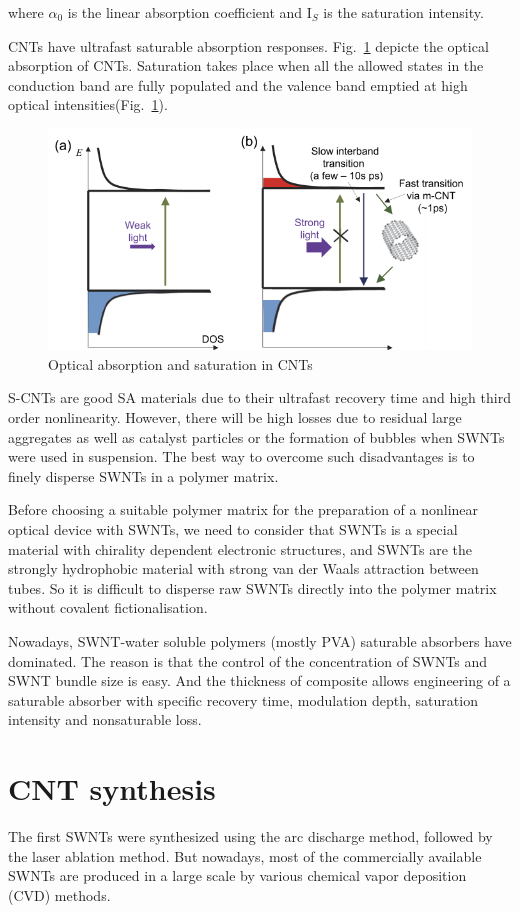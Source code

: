 \documentclass{phyasgn}\usepackage{nag}
\newcommand{\figref}[1]{Fig.~\ref{#1}}
\begin{document}
where $\alpha_0$ is the linear absorption coefficient and I$_S$ is the saturation intensity.
\par CNTs have ultrafast saturable absorption responses\cite{chen2002ultrafast,tatsuura2003semiconductor}. \figref{9} depicte the optical absorption of CNTs. Saturation takes place when all the allowed states in the conduction band are fully populated and the valence band emptied at high optical intensities(\figref{9}).
\begin{figure}[!h]
	\centering
	\includegraphics[width=.7\linewidth]{pic/9.png}
	\caption[Band structures]{Optical absorption and saturation in CNTs\cite{martinez2013nanotube}}
	\label{9}
	\end{figure}
\par S-CNTs are good SA materials due to their ultrafast recovery time and high third order nonlinearity. However, there will be high losses due to residual large aggregates as well as catalyst particles or the formation of bubbles when SWNTs were used in suspension\cite{yamashita2004saturable}. The best way to overcome such disadvantages is to finely disperse SWNTs in a polymer matrix\cite{yamashita2004saturable}.
\par Before choosing a suitable polymer matrix for the preparation of a nonlinear optical device with SWNTs, we need to consider that SWNTs is a special material with chirality dependent electronic structures, and SWNTs are the strongly hydrophobic material with strong van der Waals attraction between tubes. So it is difficult to disperse raw SWNTs directly into the polymer matrix without covalent fictionalisation.
\par Nowadays, SWNT-water soluble polymers (mostly PVA) saturable absorbers have dominated. The reason is that the control of the concentration of SWNTs and SWNT bundle size is easy. And the thickness of composite allows engineering of a saturable absorber with specific recovery time, modulation depth, saturation intensity and nonsaturable loss.
\section{CNT synthesis}
The first SWNTs were synthesized using the arc discharge method\cite{kundrapu2012model}, followed by the laser ablation method\cite{hutchens2012vertically}. But nowadays, most of the commercially available SWNTs are produced in a large scale by various chemical vapor deposition (CVD) methods\cite{li2004preferential,resasco2002scalable}.
\end{document}
